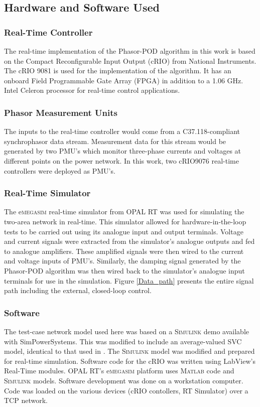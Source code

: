 \documentclass[conference]{IEEEtran}
\begin{document}
\subsection{Hardware and Software Used}
\subsubsection*{Real-Time Controller} The real-time implementation of the Phasor-POD algorithm in this work is based on the Compact Reconfigurable Input Output (cRIO) from National Instruments. The cRIO 9081 \cite{cRIO9081} is used for the implementation of the algorithm. It has an onboard Field Programmable Gate Array (FPGA) in addition to a 1.06 GHz. Intel Celeron processor for real-time control applications\cite{cRIO9081}.\\

\subsubsection*{Phasor Measurement Units}
The inputs to the real-time controller would come from a C37.118-compliant synchrophasor data stream. Measurement data for this stream would be generated by two PMU's which monitor three-phase currents and voltages at different points on the power network. In this work, two cRIO9076 real-time controllers \cite{cRIO9076} were deployed as PMU's.\\

\subsubsection*{Real-Time Simulator}
The e\textsc{megasim} real-time simulator from OPAL RT \cite{eMEGASIM} was used for simulating the two-area network in real-time. This simulator allowed for hardware-in-the-loop tests to be carried out using its analogue input and output terminals. Voltage and current signals were extracted from the simulator's analogue outputs and fed to analogue amplifiers. These amplified signals were then wired to the current and voltage inputs of PMU's. Similarly, the damping signal generated by the Phasor-POD algorithm was then wired back to the simulator's analogue input terminals for use in the simulation. Figure \ref{Data_path} presents the entire signal path including the external, closed-loop control.\\

\subsubsection*{Software}
The test-case network model used here was based on a \textsc{Simulink} demo available with SimPowerSystems. This was modified to include an average-valued SVC model, identical to that used in \cite{PhasorPODImplement}. The \textsc{Simulink} model was modified and prepared for real-time simulation. Software code for the cRIO was written using LabView's Real-Time modules. OPAL RT's e\textsc{megasim} platform uses \textsc{Matlab} code and \textsc{Simulink} models. Software development was done on a workstation computer. Code was loaded on the various devices (cRIO contollers, RT Simulator) over a TCP network.\\
\end{document}
